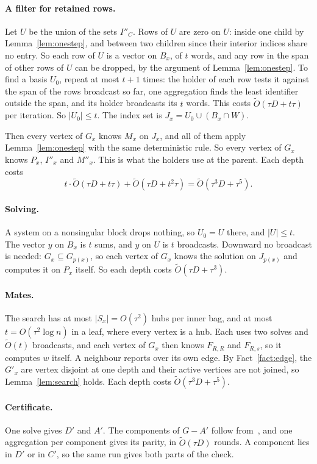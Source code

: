 \documentclass[11pt]{article}
\theoremstyle{definition}
\theoremstyle{remark}
\theoremstyle{plain}
\newcommand{\Ot}{\tilde O}
\begin{document}
\paragraph{A filter for retained rows.} Let $U$ be the union of the sets $I''_C$. Rows of $U$ are zero on $U$: inside one child by Lemma~\ref{lem:onestep}, and between two children since their interior indices share no entry. So each row of $U$ is a vector on
$B_x$, of $t$ words, and any row in the span of other rows of $U$ can be dropped, by the argument of Lemma~\ref{lem:onestep}. To find a basis $U_0$, repeat at most $t+1$ times: the holder of each row tests it against the span of the rows broadcast so far, one
aggregation finds the least identifier outside the span, and its holder broadcasts its $t$ words. This costs $\Ot(\tau D+t\tau)$ per iteration. So $|U_0|\le t$. The index set is $J_x=U_0\cup(B_x\cap W)$.

Then every vertex of $G_x$ knows $M_x$ on $J_x$, and all of them apply Lemma~\ref{lem:onestep} with the same deterministic rule. So every vertex of $G_x$ knows $P_x$, $I''_x$ and $M''_x$. This is what the holders use at the parent. Each depth costs
\[
t\cdot\Ot(\tau D+t\tau)+\Ot(\tau D+t^2\tau)=\Ot(\tau^3D+\tau^5).
\]

\paragraph{Solving.} A system on a nonsingular block drops nothing, so $U_0=U$ there, and $|U|\le t$. The vector $y$ on $B_x$ is $t$ sums, and $y$ on $U$ is $t$ broadcasts. Downward no broadcast is needed: $G_x\subseteq G_{p(x)}$, so each vertex of $G_x$ knows the solution on
$J_{p(x)}$ and computes it on $P_x$ itself. So each depth costs $\Ot(\tau D+\tau^3)$.

\paragraph{Mates.} The search has at most $|S_x|=O(\tau^2)$ hubs per inner bag, and at most $t=O(\tau^2\log n)$ in a leaf, where every vertex is a hub. Each uses two solves and $\Ot(t)$ broadcasts, and each vertex of $G_x$ then knows $F_{R,R}$ and $F_{R,s}$, so it
computes $w$ itself. A neighbour reports over its own edge. By Fact~\ref{fact:edge}, the $G'_x$ are vertex disjoint at one depth and their active vertices are not joined, so Lemma~\ref{lem:search} holds. Each depth costs $\Ot(\tau^3D+\tau^5)$.

\paragraph{Certificate.} One solve gives $D'$ and $A'$. The components of $G-A'$ follow from~\cite[Lemma 8]{IKNS22}, and one aggregation per component gives its parity, in $\Ot(\tau D)$ rounds. A component lies in $D'$ or in $C'$, so the same run gives both parts of the check.
\end{document}
